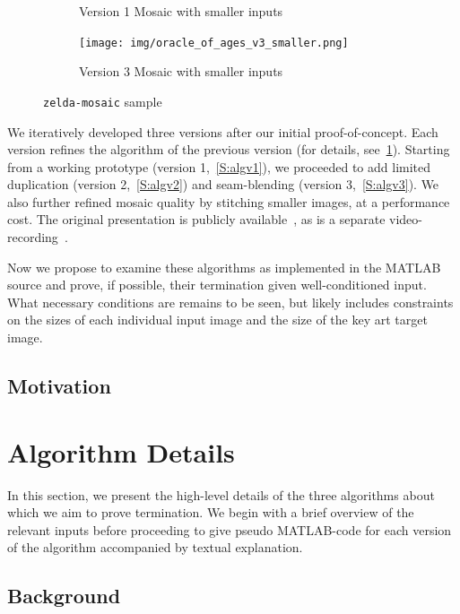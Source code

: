 \documentclass[11pt,conference]{IEEEtran}
\begin{document}
\begin{figure}[!t]
\begin{subfigure}{0.35\textwidth}
        \caption{Version 1 Mosaic with smaller inputs}
    \end{subfigure}
    \begin{subfigure}{0.35\textwidth}
        \texttt{[image: img/oracle\_of\_ages\_v3\_smaller.png]}
        \caption{Version 3 Mosaic with smaller inputs}
    \end{subfigure}
    \caption{\texttt{zelda-mosaic} sample}\label{F:zelda-mosaic-sample}
\end{figure}

We iteratively developed three versions after our initial proof-of-concept. Each
version refines the algorithm of the previous version (for details,
see~\ref{S:AlgDet}). Starting from a working prototype (version
1,~\ref{S:algv1}), we proceeded to add limited duplication (version
2,~\ref{S:algv2}) and seam-blending (version 3,~\ref{S:algv3}). We also further
refined mosaic quality by stitching smaller images, at a performance cost. The
original presentation is publicly available~\cite{zelda_mosaic_pres}, as is a
separate video-recording~\cite{zelda_mosaic_vid}.

Now we propose to examine these algorithms as implemented in the MATLAB source
and prove, if possible, their termination given well-conditioned input. What
necessary conditions are remains to be seen, but likely includes constraints on
the sizes of each individual input image and the size of the key art target
image.

\subsection{Motivation}


\section{Algorithm Details}\label{S:AlgDet}

In this section, we present the high-level details of the three algorithms about
which we aim to prove termination. We begin with a brief overview of the
relevant inputs before proceeding to give pseudo MATLAB-code for each version of
the algorithm accompanied by textual explanation.

\subsection{Background}
\end{document}
